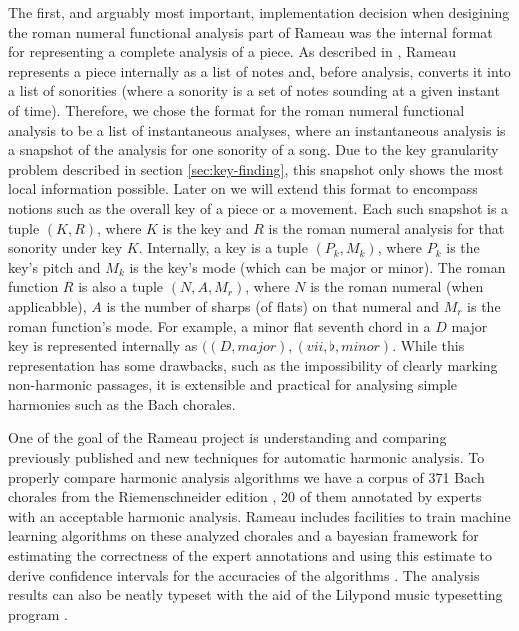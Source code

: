 The first, and arguably most important, implementation decision when
desigining the roman numeral functional analysis part of Rameau was
the internal format for representing a complete analysis of a piece.
As described in \cite{kroger08:rameau}, Rameau represents a piece
internally as a list of notes and, before analysis, converts it into a
list of sonorities (where a sonority is a set of notes sounding at a
given instant of time). Therefore, we chose the format for the roman
numeral functional analysis to be a list of instantaneous analyses,
where an instantaneous analysis is a snapshot of the analysis for one
sonority of a song. Due to the key granularity problem described in
section \ref{sec:key-finding}, this snapshot only shows the most local
information possible. Later on we will extend this format to encompass
notions such as the overall key of a piece or a movement. Each such
snapshot is a tuple $(K,R)$, where $K$ is the key and $R$ is the roman
numeral analysis for that sonority under key $K$. Internally, a key is
a tuple $(P_k,M_k)$, where $P_k$ is the key's pitch and $M_k$ is the
key's mode (which can be major or minor).  The roman function $R$ is
also a tuple $(N,A,M_r)$, where $N$ is the roman numeral (when
applicabble), $A$ is the number of sharps (of flats) on that numeral
and $M_r$ is the roman function's mode. For example, a minor flat
seventh chord in a $D$ major key is represented internally as
$((D,major),(vii,\flat,minor)$. While this representation has some
drawbacks, such as the impossibility of clearly marking non-harmonic
passages, it is extensible and practical for analysing simple
harmonies such as the Bach chorales.

 One of the goal of the Rameau project is understanding and
comparing previously published and new techniques for automatic
harmonic analysis. To properly compare harmonic analysis algorithms we
have a corpus of 371 Bach chorales from the Riemenschneider edition
\cite{bach41:371}, 20 of them annotated by experts with an acceptable
harmonic analysis. Rameau includes facilities to train machine
learning algorithms on these analyzed chorales and a bayesian
framework for estimating the correctness of the expert annotations and
using this estimate to derive confidence intervals for the accuracies
of the algorithms . The analysis results can
also be neatly typeset with the aid of the Lilypond music typesetting
program \cite{nienhuys.ea08:lilypond}.

